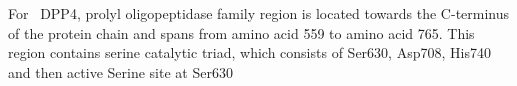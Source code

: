 For~ DPP4, prolyl oligopeptidase family region is located towards the C-terminus of the protein chain and spans from amino acid 559 to amino acid 765. This region contains serine catalytic triad, which consists of Ser630, Asp708, His740 and then active Serine site at Ser630  
